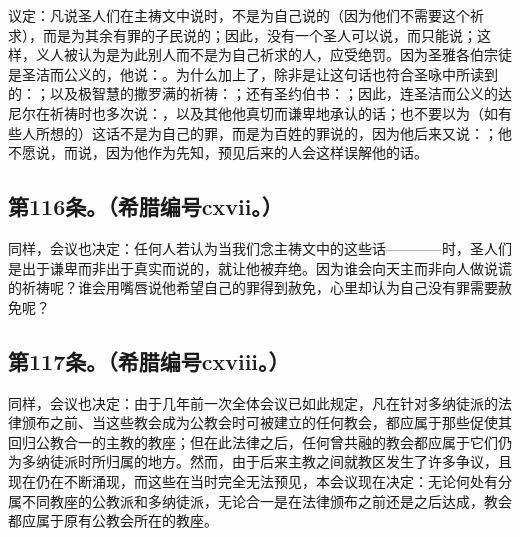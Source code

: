 议定：凡说圣人们在主祷文中说时，不是为自己说的（因为他们不需要这个祈求），而是为其余有罪的子民说的；因此，没有一个圣人可以说，而只能说；这样，义人被认为是为此别人而不是为自己祈求的人，应受绝罚。因为圣雅各伯宗徒是圣洁而公义的，他说：。为什么加上了，除非是让这句话也符合圣咏中所读到的：；以及极智慧的撒罗满的祈祷：；还有圣约伯书：；因此，连圣洁而公义的达尼尔在祈祷时也多次说：，以及其他他真切而谦卑地承认的话；也不要以为（如有些人所想的）这话不是为自己的罪，而是为百姓的罪说的，因为他后来又说：；他不愿说，而说，因为他作为先知，预见后来的人会这样误解他的话。\par


\subsection{第116条。（希腊编号cxvii。）}

\par

同样，会议也决定：任何人若认为当我们念主祷文中的这些话————时，圣人们是出于谦卑而非出于真实而说的，就让他被弃绝。因为谁会向天主而非向人做说谎的祈祷呢？谁会用嘴唇说他希望自己的罪得到赦免，心里却认为自己没有罪需要赦免呢？\par


\subsection{第117条。（希腊编号cxviii。）}

\par

同样，会议也决定：由于几年前一次全体会议已如此规定，凡在针对多纳徒派的法律颁布之前、当这些教会成为公教会时可被建立的任何教会，都应属于那些促使其回归公教合一的主教的教座；但在此法律之后，任何曾共融的教会都应属于它们仍为多纳徒派时所归属的地方。然而，由于后来主教之间就教区发生了许多争议，且现在仍在不断涌现，而这些在当时完全无法预见，本会议现在决定：无论何处有分属不同教座的公教派和多纳徒派，无论合一是在法律颁布之前还是之后达成，教会都应属于原有公教会所在的教座。\par

